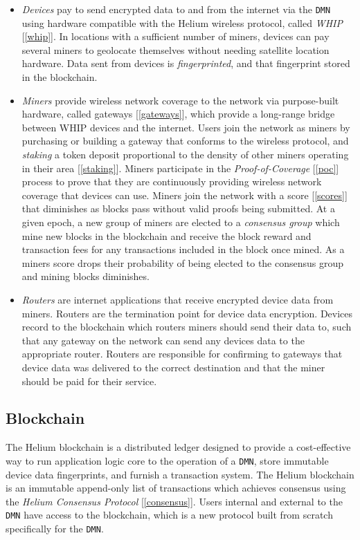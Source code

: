\documentclass[UTF8, 10pt, nonatbib, nocopyrightspace, reprint]{sigplanconf}
\newcommand{\secref}[1]{[\autoref{#1}]}
\begin{document}
\begin{itemize}
    \item \emph{Devices} pay to send encrypted data to and from the internet via the \verb|DMN| using hardware compatible with the Helium wireless protocol, called \emph{WHIP} \secref{whip}. In locations with a sufficient number of miners, devices can pay several miners to geolocate themselves without needing satellite location hardware. Data sent from devices is \emph{fingerprinted}, and that fingerprint stored in the blockchain.
    \item \emph{Miners} provide wireless network coverage to the network via purpose-built hardware, called gateways \secref{gateways}, which provide a long-range bridge between WHIP devices and the internet. Users join the network as miners by purchasing or building a gateway that conforms to the wireless protocol, and \emph{staking} a token deposit proportional to the density of other miners operating in their area \secref{staking}. Miners participate in the \emph{Proof-of-Coverage} \secref{poc} process to prove that they are continuously providing wireless network coverage that devices can use. Miners join the network with a score \secref{scores} that diminishes as blocks pass without valid proofs being submitted. At a given epoch, a new group of miners are elected to a \emph{consensus group} which mine new blocks in the blockchain and receive the block reward and transaction fees for any transactions included in the block once mined. As a miners score drops their probability of being elected to the consensus group and mining blocks diminishes.
    \item \emph{Routers} are internet applications that receive encrypted device data from miners. Routers are the termination point for device data encryption. Devices record to the blockchain which routers miners should send their data to, such that any gateway on the network can send any devices data to the appropriate router. Routers are responsible for confirming to gateways that device data was delivered to the correct destination and that the miner should be paid for their service.
\end{itemize}

\subsection{Blockchain} \label{blockchain}

The Helium blockchain is a distributed ledger designed to provide a cost-effective way to run application logic core to the operation of a \verb|DMN|, store immutable device data fingerprints, and furnish a transaction system. The Helium blockchain is an immutable append-only list of transactions which achieves consensus using the \emph{Helium Consensus Protocol} \secref{consensus}. Users internal and external to the \verb|DMN| have access to the blockchain, which is a new protocol built from scratch specifically for the \verb|DMN|.
\end{document}
